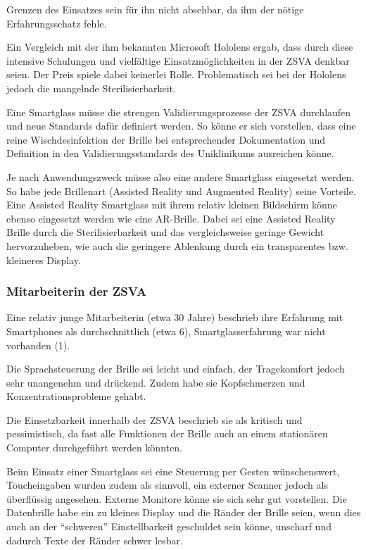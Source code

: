 Grenzen des Einsatzes sein für ihn nicht absehbar, da ihm der nötige Erfahrungsschatz fehle.

Ein Vergleich mit der ihm bekannten Microsoft Hololens ergab, dass durch diese intensive Schulungen und vielfältige Einsatzmöglichkeiten in der ZSVA denkbar seien. Der Preis spiele dabei keinerlei Rolle. Problematisch sei bei der Hololens jedoch die mangelnde Sterilisierbarkeit.

Eine Smartglass müsse die strengen Validierungsprozesse der ZSVA durchlaufen und neue Standards dafür definiert werden. So könne er sich vorstellen, dass eine reine Wischdesinfektion der Brille bei entsprechender Dokumentation und Definition in den Validierungsstandards des Uniklinikums ausreichen könne.

Je nach Anwendungszweck müsse also eine andere Smartglass eingesetzt werden. So habe jede Brillenart (Assisted Reality und Augmented Reality) seine Vorteile. Eine Assisted Reality Smartglass mit ihrem relativ kleinen Bildschirm könne ebenso eingesetzt werden wie eine AR-Brille. Dabei sei eine Assisted Reality Brille durch die Sterilisierbarkeit und das vergleichsweise geringe Gewicht hervorzuheben, wie auch die geringere Ablenkung durch ein transparentes bzw. kleineres Display.
%
\subsubsection{Mitarbeiterin der ZSVA}
%
Eine relativ junge Mitarbeiterin (etwa 30 Jahre) beschrieb ihre Erfahrung mit Smartphones als durchschnittlich (etwa 6), Smartglasserfahrung war nicht vorhanden (1).

Die Sprachsteuerung der Brille sei leicht und einfach, der Tragekomfort jedoch sehr unangenehm und drückend. Zudem habe sie Kopfschmerzen und Konzentrationsprobleme gehabt.

Die Einsetzbarkeit innerhalb der ZSVA beschrieb sie als kritisch und pessimistisch, da fast alle Funktionen der Brille auch an einem stationären Computer durchgeführt werden könnten. 

Beim Einsatz einer Smartglass sei eine Steuerung per Gesten wünschenswert, Toucheingaben wurden zudem als sinnvoll, ein externer Scanner jedoch als überflüssig angesehen. Externe Monitore könne sie sich sehr gut vorstellen. Die Datenbrille habe ein zu kleines Display und die Ränder der Brille seien, wenn dies auch an der \enquote{schweren} Einstellbarkeit geschuldet sein könne, unscharf und dadurch Texte der Ränder schwer lesbar.

